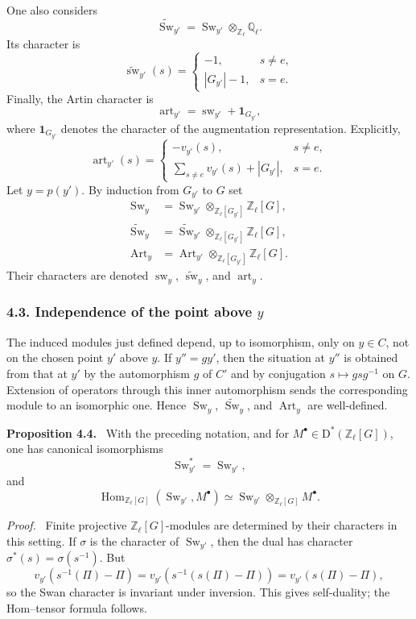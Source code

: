 \documentclass[14pt]{extarticle}
\newcommand{\ZZ}{\mathbb Z}
\newcommand{\QQ}{\mathbb Q}
\newcommand{\Hom}{\operatorname{Hom}}
\newcommand{\Sw}{\operatorname{Sw}}
\newcommand{\Art}{\operatorname{Art}}
\newcommand{\D}{\mathrm D}
\newcommand{\wt}[1]{\widetilde{#1}}
\newenvironment{statement}[1]{\par\medskip\noindent\textbf{#1.}\ }{\par\medskip}
\newenvironment{prooftext}[1][Proof]{\par\noindent\emph{#1.}\ }{\par\medskip}
\begin{document}
One also considers
\[
   \wt{\Sw}_{y'}=\Sw_{y'}\otimes_{\ZZ_\ell}\QQ_\ell.
\]
Its character is
\[
   \widetilde{\operatorname{sw}}_{y'}(s)=
   \begin{cases}
      -1, & s\ne e,\\[0.3em]
      |G_{y'}|-1, & s=e.
   \end{cases}
\]
Finally, the Artin character is
\[
   \operatorname{art}_{y'}=\operatorname{sw}_{y'}+\mathbf 1_{G_{y'}},
\]
where $\mathbf 1_{G_{y'}}$ denotes the character of the augmentation representation. Explicitly,
\[
   \operatorname{art}_{y'}(s)=
   \begin{cases}
      -v_{y'}(s), & s\ne e,\\[0.3em]
      \sum_{s\ne e}v_{y'}(s)+|G_{y'}|, & s=e.
   \end{cases}
\]
Let $y=p(y')$. By induction from $G_{y'}$ to $G$ set
\[
\begin{aligned}
   \Sw_y &= \Sw_{y'}\otimes_{\ZZ_\ell[G_{y'}]}\ZZ_\ell[G],\\
   \wt{\Sw}_y &= \wt{\Sw}_{y'}\otimes_{\ZZ_\ell[G_{y'}]}\ZZ_\ell[G],\\
   \Art_y &= \Art_{y'}\otimes_{\ZZ_\ell[G_{y'}]}\ZZ_\ell[G].
\end{aligned}
\]
Their characters are denoted $\operatorname{sw}_y$, $\widetilde{\operatorname{sw}}_y$, and $\operatorname{art}_y$.

\subsubsection*{4.3. Independence of the point above $y$}

The induced modules just defined depend, up to isomorphism, only on $y\in C$, not on the chosen point $y'$ above $y$. If $y''=g y'$, then the situation at $y''$ is obtained from that at $y'$ by the automorphism $g$ of $C'$ and by conjugation $s\mapsto gsg^{-1}$ on $G$. Extension of operators through this inner automorphism sends the corresponding module to an isomorphic one. Hence $\Sw_y$, $\wt{\Sw}_y$, and $\Art_y$ are well-defined.

\begin{statement}{Proposition 4.4}
With the preceding notation, and for $M^\bullet\in\D^*(\ZZ_\ell[G])$, one has canonical isomorphisms
\[
   \Sw_{y'}^*=\Sw_{y'},
\]
and
\[
   \Hom_{\ZZ_\ell[G]}(\Sw_{y'},M^\bullet)
      \simeq \Sw_{y'}\otimes_{\ZZ_\ell[G]}M^\bullet.
\]
\end{statement}

\begin{prooftext}
Finite projective $\ZZ_\ell[G]$-modules are determined by their characters in this setting. If $\sigma$ is the character of $\Sw_{y'}$, then the dual has character $\sigma^*(s)=\sigma(s^{-1})$. But
\[
   v_{y'}(s^{-1}(\Pi)-\Pi)
    =v_{y'}(s^{-1}(s(\Pi)-\Pi))
    =v_{y'}(s(\Pi)-\Pi),
\]
so the Swan character is invariant under inversion. This gives self-duality; the Hom--tensor formula follows.
\end{prooftext}
\end{document}
